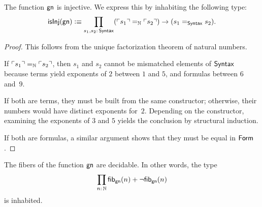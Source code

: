 \begin{thm}\label{thm:gn-is-injective}
    The function\/ $\mathsf{gn}$ is injective. We express this by inhabiting the following type:\/
    \[
        \fun{isInj}(\fun{gn})\defeq
        \prod_{s_1,s_2\colon\fun{Syntax}} 
        (\gn{s_1}\eq{\N}\gn{s_2})
        \to (s_1 \eq{\fun{Syntax}}s_2).
    \]
\end{thm}

\begin{proof}
    This follows from the unique factorization theorem of natural numbers.
    
    If $\ulcorner s_1\urcorner\mathrel{=_{\mathbb{N}}}\ulcorner s_2\urcorner$, then $s_1$ and $s_2$ cannot be mismatched elements of $\mathsf{Syntax}$ because terms yield exponents of $2$ between $1$ and $5$, and formulas between $6$ and~$9$.

    If both are terms, they must be built from the same constructor; otherwise, their numbers would have distinct exponents for~$2$. Depending on the constructor, examining the exponents of $3$ and $5$ yields the conclusion by structural induction.

    If both are formulas, a similar argument shows that they must be equal in $\mathsf{Form}$.
\end{proof}

\begin{thm}\label{thm:gn-has-decidable-fibers}
    The fibers of the function\/ $\mathsf{gn}$ are decidable. In other words, the type
    \[
        \prod_{n\colon\N}
            \fun{fib}_{\fun{gn}}(n)
            +
            \neg\fun{fib}_{\fun{gn}}(n)
    \]
    is inhabited.
\end{thm}

